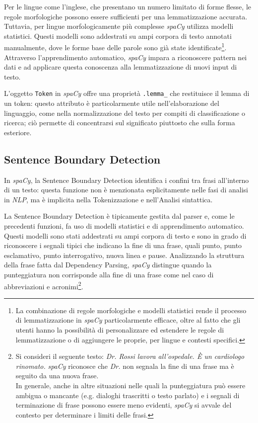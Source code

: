 \documentclass[12pt]{report}
\newcommand{\spacy}{\textsl{spaCy}\xspace}
\newcommand{\nlp}{\textsl{NLP}\xspace}
\begin{document}
Per le lingue come l'inglese, che presentano un numero limitato di forme flesse, le regole morfologiche possono essere sufficienti per una lemmatizzazione accurata. Tuttavia, per lingue morfologicamente più complesse \spacy utilizza modelli statistici. Questi modelli sono addestrati su ampi corpora di testo annotati manualmente, dove le forme base delle parole sono già state identificate\footnote{La combinazione di regole morfologiche e modelli statistici rende il processo di lemmatizzazione in \spacy particolarmente efficace, oltre al fatto che gli utenti hanno la possibilità di personalizzare ed estendere le regole di lemmatizzazione o di aggiungere le proprie, per lingue e contesti specifici.}. Attraverso l'apprendimento automatico, \spacy impara a riconoscere pattern nei dati e ad applicare questa conoscenza alla lemmatizzazione di nuovi input di testo.

L'oggetto \texttt{Token} in \spacy offre una proprietà \texttt{.lemma\_} che restituisce il lemma di un token: questo attributo è particolarmente utile nell'elaborazione del linguaggio, come nella normalizzazione del testo per compiti di classificazione o ricerca; ciò permette di concentrarsi sul significato piuttosto che sulla forma esteriore.


\subsection{Sentence Boundary Detection}
In \spacy, la Sentence Boundary Detection identifica i confini tra frasi all'interno di un testo: questa funzione non è menzionata esplicitamente nelle fasi di analisi in \nlp, ma è implicita nella \textsf{Tokenizzazione} e nell’\textsf{Analisi sintattica}.

La Sentence Boundary Detection è tipicamente gestita dal parser e, come le precedenti funzioni, fa uso di modelli statistici e di apprendimento automatico. Questi modelli sono stati addestrati su ampi corpora di testo e sono in grado di riconoscere i segnali tipici che indicano la fine di una frase, quali punto, punto esclamativo, punto interrogativo, nuova linea e pause. Analizzando la struttura della frase fatta dal Dependency Parsing, \spacy distingue quando la punteggiatura non corrisponde alla fine di una frase come nel caso di abbreviazioni e acronimi\footnote{Si consideri il seguente testo: \textit{Dr. Rossi lavora all'ospedale. È un cardiologo rinomato.} \spacy riconosce che \textit{Dr.} non segnala la fine di una frase ma è seguito da una nuova frase.\\
In generale, anche in altre situazioni nelle quali la punteggiatura può essere ambigua o mancante (e.g. dialoghi trascritti o testo parlato) e i segnali di terminazione di frase possono essere meno evidenti, \spacy si avvale del contesto per determinare i limiti delle frasi.}.
\end{document}
